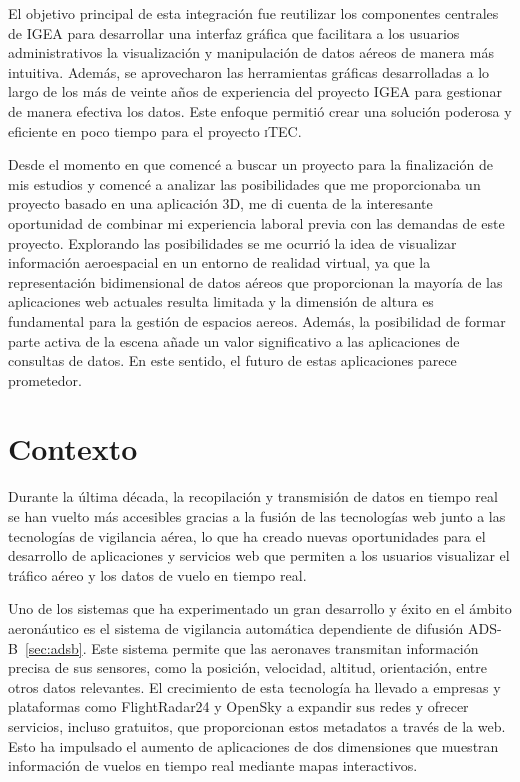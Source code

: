 \documentclass[a4paper, 11pt]{book}
\begin{document}
El objetivo principal de esta integración fue reutilizar los componentes centrales de \textsc{IGEA} para desarrollar una interfaz gráfica que facilitara a los usuarios administrativos la visualización y manipulación de datos aéreos de manera más intuitiva. Además, se aprovecharon las herramientas gráficas desarrolladas a lo largo de los más de veinte años de experiencia del proyecto \textsc{IGEA} para gestionar de manera efectiva los datos. Este enfoque permitió crear una solución poderosa y eficiente en poco tiempo para el proyecto \textsc{iTEC}.

Desde el momento en que comencé a buscar un proyecto para la finalización de mis estudios y comencé a analizar las posibilidades que me proporcionaba un proyecto basado en una aplicación \textsc{3D}, me di cuenta de la interesante oportunidad de combinar mi experiencia laboral previa con las demandas de este proyecto. 
Explorando las posibilidades se me ocurrió la idea de visualizar información aeroespacial en un entorno de realidad virtual, ya que la representación bidimensional de datos aéreos que proporcionan la mayoría de las aplicaciones web actuales resulta limitada y la dimensión de altura es fundamental para la gestión de espacios aereos. Además, la posibilidad de formar parte activa de la escena añade un valor significativo a las aplicaciones de consultas de datos. En este sentido, el futuro de estas aplicaciones parece prometedor.

\section{Contexto}
\label{sec:contexto}
Durante la última década, la recopilación y transmisión de datos en tiempo real se han vuelto más accesibles gracias a la fusión de las tecnologías web junto a las tecnologías de vigilancia aérea, lo que ha creado nuevas oportunidades para el desarrollo de aplicaciones y servicios web que permiten a los usuarios visualizar el tráfico aéreo y los datos de vuelo en tiempo real.

Uno de los sistemas que ha experimentado un gran desarrollo y éxito en el ámbito aeronáutico es el sistema de vigilancia automática dependiente de difusión \textsc{ADS-B}~\ref{sec:adsb}. Este sistema permite que las aeronaves transmitan información precisa de sus sensores, como la posición, velocidad, altitud, orientación, entre otros datos relevantes. 
El crecimiento de esta tecnología ha llevado a empresas y plataformas como FlightRadar24 y OpenSky a expandir sus redes y ofrecer servicios, incluso gratuitos, que proporcionan estos metadatos a través de la web. Esto ha impulsado el aumento de aplicaciones de dos dimensiones que muestran información de vuelos en tiempo real mediante mapas interactivos.
\end{document}
